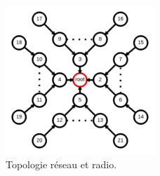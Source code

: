 

\begin{figure}[tb]
  \centering
  \includegraphics[width=0.5\textwidth]{img/topology_tree.png}
  \caption{Topologie réseau et radio.}
  \label{supervision:fig:topology_tree}
\end{figure}



